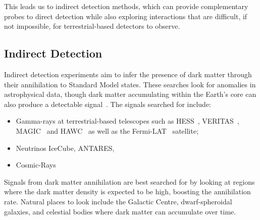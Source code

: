 This leads us to indirect detection methods, which can provide complementary probes to direct detection while also exploring interactions that are difficult, if not impossible, for terrestrial-based detectors to observe.
\subsection{Indirect Detection}

Indirect detection experiments aim to infer the presence of dark matter through their annihilation to Standard Model states. These searches look for anomalies in astrophysical data, though dark matter accumulating within the Earth's core can also produce a detectable signal~\cite{Lee:2013iua_jan_Constrainingdarkmatter, ANTARES:2016bxz_SearchDarkMatter}. The signals searched for include: 
\begin{itemize}
    \item Gamma-rays at terrestrial-based telescopes such as HESS~\cite{HESS:2018cbt_may_SearchgRayLine, Montanari:2023bzn_jul_Searchdarkmatter, HESS:2006zwn_ObservationsGalacticCenter}, VERITAS~\cite{VERITAS:2017tif_apr_DarkMatterConstraints, Ryan:2023yzu_jul_SearchDarkMatter, McGrath:2023oto_jul_IndirectsearchDark, McGrath:2023oto_IndirectsearchDarkMcGrath:2023btk_IndirectsearchDark, Ryan:2023yzu_jul_SearchDarkMatter}, MAGIC~\cite{MAGIC:2009tyk_MAGICGammaRayTelescope, MAGIC:2011nta_SearchesDarkMatter, MAGIC:2011nta_SearchesDarkMatter, MAGIC:2009tyk_MAGICGammaRayTelescope} and HAWC~\cite{HAWC:2017mfa_feb_DarkMatterLimits, HAWC:2017udy_feb_SearchDarkMatter, HAWC:2017udy_feb_SearchDarkMatter, HAWC:2017mfa_feb_DarkMatterLimits, Proper:2015xya_jul_FirstLimitsDark, Harding:2015bua_jul_DarkMatterAnnihilation} as well as the Fermi-LAT~\cite{Fermi-LAT:2015att_nov_SearchingDarkMatter, Fermi-LAT:2015att_nov_SearchingDarkMatterFermi-LAT:2015kyq_nov_SearchingDarkMatter, Fermi-LAT:2012ugx_FermiLATSearch, Fermi-LAT:2010qeq_ConstraintsCosmologicalDark, Fermi-LAT:2015att_nov_SearchingDarkMatterFermi-LAT:2015kyq_nov_SearchingDarkMatter, Fermi-LAT:2015att_nov_SearchingDarkMatter, Su:2010qj_GiantGammarayBubbles} satellite;
    \item  Neutrinos IceCube, ANTARES, 
    \item Cosmic-Rays
\end{itemize}


Signals from dark matter annihilation are best searched for by looking at regions where the dark matter density is expected to be high, boosting the annihilation rate. Natural places to look include the Galactic Centre, dwarf-spheroidal galaxies, and celestial bodies where dark matter can accumulate over time.




